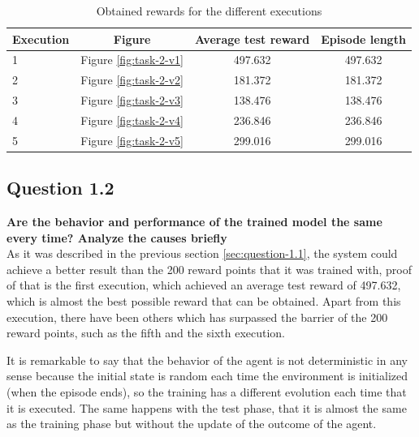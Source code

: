 \documentclass[12pt]{article}
\begin{document}
\begin{table}[h]
\centering
\begin{tabular}{l|ccc}

\multicolumn{1}{l|}{Execution} & Figure                                      & \multicolumn{1}{l}{Average test reward} & \multicolumn{1}{l}{Episode length} \\ \hline
1                               & Figure \ref{fig:task-2-v1} & 497.632                                  & 497.632                             \\
2                               & Figure \ref{fig:task-2-v2} & 181.372                                  & 181.372                             \\
3                               & Figure \ref{fig:task-2-v3} & 138.476                                  & 138.476                             \\
4                               & Figure \ref{fig:task-2-v4} & 236.846                                  & 236.846                             \\
5                               & Figure \ref{fig:task-2-v5} & 299.016                                  & 299.016                            
\end{tabular}
\caption{Obtained rewards for the different executions}
\label{ref:rewards-table}
\end{table}

\subsection{Question 1.2}
\label{sec:question-1.2}
\textbf {
    Are the behavior and performance of the trained model the same every time? Analyze the causes briefly
}\\

As it was described in the previous section \ref{sec:question-1.1}, the system could achieve a better result than the 200 reward points that it was trained with, proof of that is the first execution, which achieved an average test reward of 497.632, which is almost the best possible reward that can be obtained. Apart from this execution, there have been others which has surpassed the barrier of the 200 reward points, such as the fifth and the sixth execution. 

It is remarkable to say that the behavior of the agent is not deterministic in any sense because the initial state is random each time the environment is initialized (when the episode ends), so the training has a different evolution each time that it is executed. The same happens with the test phase, that it is almost the same as the training phase but without the update of the outcome of the agent. \\
\end{document}
